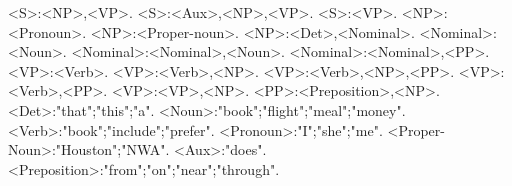 <S>:<NP>,<VP>.
<S>:<Aux>,<NP>,<VP>.
<S>:<VP>.
<NP>:<Pronoun>.
<NP>:<Proper-noun>.
<NP>:<Det>,<Nominal>.
<Nominal>:<Noun>.
<Nominal>:<Nominal>,<Noun>.
<Nominal>:<Nominal>,<PP>.
<VP>:<Verb>.
<VP>:<Verb>,<NP>.
<VP>:<Verb>,<NP>,<PP>.
<VP>:<Verb>,<PP>.
<VP>:<VP>,<NP>.
<PP>:<Preposition>,<NP>.
<Det>:"that";"this";"a".
<Noun>:"book";"flight";"meal";"money".
<Verb>:"book";"include";"prefer".
<Pronoun>:"I";"she";"me".
<Proper-Noun>:"Houston";"NWA".
<Aux>:"does".
<Preposition>:"from";"on";"near";"through".